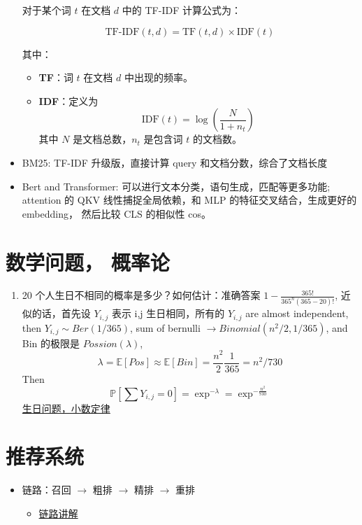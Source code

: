 \documentclass[12pt]{article}
\numberwithin{theorem}{section} %
\numberwithin{definition}{section} %
\numberwithin{assumption}{section} %
\numberwithin{lemma}{section} %
\numberwithin{remark}{section} %
\numberwithin{prop}{section} %
\numberwithin{corollary}{section} %
\numberwithin{example}{section} %
\numberwithin{question}{section} %
\numberwithin{problem}{section} %
\numberwithin{conjecture}{section} %
\numberwithin{append}{section} %
\numberwithin{property}{section} %
\def\P{{\mathbb P}}     %
\def\E{{\mathbb E}}     %
\begin{document}
\begin{CJK}{UTF8}{gbsn}
\begin{itemize}
		对于某个词 $t$ 在文档 $d$ 中的 TF-IDF 计算公式为：
		
		\[
		\text{TF-IDF}(t, d) = \text{TF}(t, d) \times \text{IDF}(t)
		\]
		
		其中：
		\begin{itemize}
			\item \textbf{TF}：词 $t$ 在文档 $d$ 中出现的频率。
			\item \textbf{IDF}：定义为 
			\[
			\text{IDF}(t) = \log \left( \frac{N}{1 + n_t} \right)
			\]
			其中 $N$ 是文档总数，$n_t$ 是包含词 $t$ 的文档数。
		\end{itemize}
	\item BM25: TF-IDF 升级版，直接计算 query 和文档分数，综合了文档长度
	\item Bert and Transformer: 可以进行文本分类，语句生成，匹配等更多功能; attention 的 QKV 线性捕捉全局依赖，和 MLP 的特征交叉结合，生成更好的 embedding， 然后比较 CLS 的相似性 cos。
	
\end{itemize}


\section{数学问题， 概率论}

\begin{enumerate}
	\item 20 个人生日不相同的概率是多少？如何估计：准确答案 $1-\frac{365!}{365^n (365-20)!}$, 近似的话，首先设 $Y_{i,j}$ 表示 i,j 生日相同，所有的 $Y_{i,j}$ are almost independent, then $Y_{i,j}\sim Ber(1/365)$, sum of bernulli $\to Binomial(n^2/2, 1/365)$, and Bin 的极限是 $Possion(\lambda)$,  
	\begin{equation}
		\lambda = \E[Pos] \approx \E[Bin] = \frac{n^2}{2}\frac{1}{365}=n^2/730
	\end{equation}
	Then 
	\begin{equation}
		\P[\sum Y_{i,j} = 0] = \exp^{-\lambda} = \exp^{-\frac{n^2}{730}}
	\end{equation}
\href{https://www.zhihu.com/question/372854533}{生日问题，小数定律}
\end{enumerate}


\section{推荐系统}
\begin{itemize}
	\item 链路：召回 $\to$ 粗排 $\to$ 精排 $\to$ 重排
	\begin{itemize}
		\item \href{https://blog.csdn.net/qq_27590277/article/details/120681803}{链路讲解}
	\end{itemize}


\end{itemize}
\end{CJK}
\end{document}
